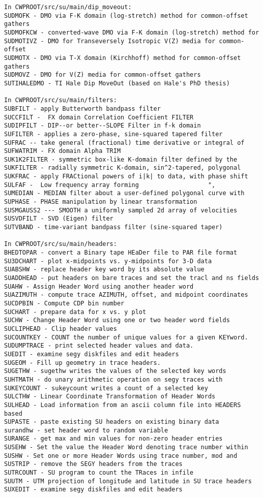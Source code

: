 {{\begin{verbatim}
In CWPROOT/src/su/main/dip_moveout:
SUDMOFK - DMO via F-K domain (log-stretch) method for common-offset gathers
SUDMOFKCW - converted-wave DMO via F-K domain (log-stretch) method for
SUDMOTIVZ - DMO for Transeversely Isotropic V(Z) media for common-offset
SUDMOTX - DMO via T-X domain (Kirchhoff) method for common-offset gathers
SUDMOVZ - DMO for V(Z) media for common-offset gathers		
SUTIHALEDMO - TI Hale Dip MoveOut (based on Hale's PhD thesis)	

In CWPROOT/src/su/main/filters:
SUBFILT - apply Butterworth bandpass filter 			
SUCCFILT -  FX domain Correlation Coefficient FILTER			
SUDIPFILT - DIP--or better--SLOPE Filter in f-k domain	
SUFILTER - applies a zero-phase, sine-squared tapered filter		
SUFRAC -- take general (fractional) time derivative or integral of	
SUFWATRIM - FX domain Alpha TRIM					
SUK1K2FILTER - symmetric box-like K-domain filter defined by the	
SUKFILTER - radially symmetric K-domain, sin^2-tapered, polygonal	
SUKFRAC - apply FRACtional powers of i|k| to data, with phase shift 
SULFAF -  Low frequency array forming					", 
SUMEDIAN - MEDIAN filter about a user-defined polygonal curve with	
SUPHASE - PHASE manipulation by linear transformation			
SUSMGAUSS2 --- SMOOTH a uniformly sampled 2d array of velocities	
SUSVDFILT - SVD (Eigen) filter					
SUTVBAND - time-variant bandpass filter (sine-squared taper)  

In CWPROOT/src/su/main/headers:
BHEDTOPAR - convert a Binary tape HEaDer file to PAR file format	
SU3DCHART - plot x-midpoints vs. y-midpoints for 3-D data	
SUABSHW - replace header key word by its absolute value	
SUADDHEAD - put headers on bare traces and set the tracl and ns fields
SUAHW - Assign Header Word using another header word			
SUAZIMUTH - compute trace AZIMUTH, offset, and midpoint coordinates    
SUCDPBIN - Compute CDP bin number					
SUCHART - prepare data for x vs. y plot			
SUCHW - Change Header Word using one or two header word fields	
SUCLIPHEAD - Clip header values					
SUCOUNTKEY - COUNT the number of unique values for a given KEYword.	
SUDUMPTRACE - print selected header values and data.              
SUEDIT - examine segy diskfiles and edit headers			
SUGEOM - Fill up geometry in trace headers.                              
SUGETHW - sugethw writes the values of the selected key words		
SUHTMATH - do unary arithmetic operation on segy traces with 	
SUKEYCOUNT - sukeycount writes a count of a selected key    
SULCTHW - Linear Coordinate Transformation of Header Words		
SULHEAD - Load information from an ascii column file into HEADERS based
SUPASTE - paste existing SU headers on existing binary data	
surandhw - set header word to random variable 		
SURANGE - get max and min values for non-zero header entries	
SUSEHW - Set the value the Header Word denoting trace number within	
SUSHW - Set one or more Header Words using trace number, mod and	
SUSTRIP - remove the SEGY headers from the traces		
SUTRCOUNT - SU program to count the TRaces in infile		
SUUTM - UTM projection of longitude and latitude in SU trace headers  
SUXEDIT - examine segy diskfiles and edit headers			


\end{verbatim}}}
